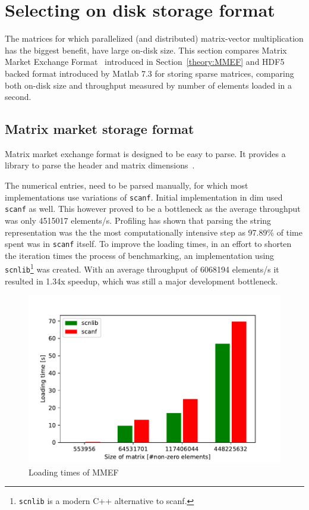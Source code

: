 \documentclass[thesis=M,english]{FITthesis}[2019/12/23]
\begin{document}
\section{Selecting on disk storage format}\label{impl:matlabComp}

The matrices for which parallelized (and distributed) matrix-vector multiplication has the biggest benefit,
have large on-disk size. This section compares Matrix Market Exchange Format~\cite{mmef} introduced in
Section~\ref{theory:MMEF} and HDF5 backed format
introduced by Matlab 7.3 for storing sparse matrices, comparing both on-disk size and throughput
measured by number of elements loaded in a second.

\subsection{Matrix market storage format}

Matrix market exchange format is designed to be easy to parse. It provides a library to parse
the header and matrix dimensions~\cite{mmC}.

The numerical entries, need to be parsed manually, for which most implemen\-tations use variations of \texttt{scanf}.
Initial implementation in dim used \texttt{scanf} as well. This however proved to be a bottleneck as
the average throughput was only 4515017 elements/s. Profiling has shown that parsing the string representation
was the the most computationally intensive step as 97.89\% of time spent was in \texttt{scanf} itself.
To improve the loading times, in an effort to
shorten the iteration times the process of benchmarking, an implementation using
\texttt{scnlib}\footnote{\texttt{scnlib} is a modern C++ alternative to scanf.}
was created. With an average throughput of 6068194 elements/s it resulted in 1.34x speedup, which was
still a major development bottleneck.

\begin{figure}[!h]
    \centering
    \includegraphics[scale=0.5]{static/mmef_loading.pdf}
    \caption{Loading times of MMEF}
\end{figure}
\end{document}
